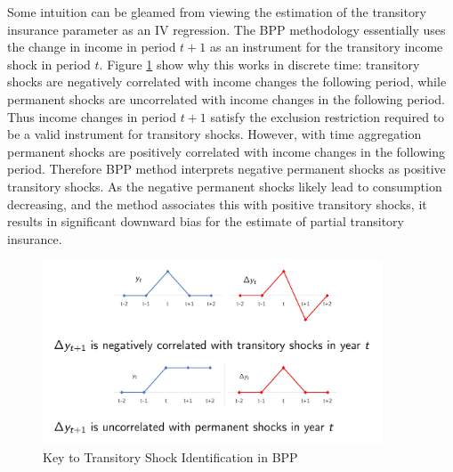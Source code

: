 \documentclass[AER]{AEA}
\begin{document}
Some intuition can be gleamed from viewing the estimation of the transitory insurance parameter as an IV regression. The BPP methodology essentially uses the change in income in period $t+1$ as an instrument for the transitory income shock in period $t$. Figure \ref{fig:BPPidentification} show why this works in discrete time: transitory shocks are negatively correlated with income changes the following period, while permanent shocks are uncorrelated with income changes in the following period. Thus income changes in period $t+1$ satisfy the exclusion restriction required to be a valid instrument for transitory shocks. However, with time aggregation permanent shocks are positively correlated with income changes in the following period. Therefore BPP method interprets negative permanent shocks as positive transitory shocks. As the negative permanent shocks likely lead to consumption decreasing, and the method associates this with positive transitory shocks, it results in significant downward bias for the estimate of partial transitory insurance.
\begin{figure}
	\includegraphics[width=0.9\textwidth]{BPP_identification.JPG}
	\caption{Key to Transitory Shock Identification in BPP}
	\label{fig:BPPidentification}
\end{figure}
\end{document}
